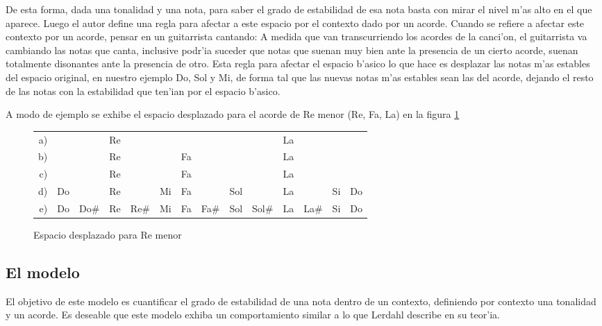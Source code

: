 
De esta forma, dada una tonalidad y una nota, para saber el grado de estabilidad de esa nota basta con mirar el nivel m'as alto en el que aparece.
Luego el autor define una regla para afectar a este espacio por el contexto dado por un acorde. Cuando se refiere a afectar este contexto por un acorde, pensar
en un guitarrista cantando: A medida que van transcurriendo los acordes de la canci'on, el guitarrista va cambiando las notas que canta, inclusive podr'ia
suceder que notas que suenan muy bien ante la presencia de un cierto acorde, suenan totalmente disonantes ante la presencia de otro. 
Esta regla para afectar el espacio b'asico lo que hace es desplazar las notas m'as estables del espacio original, en nuestro ejemplo Do, Sol y Mi, de forma tal
que las nuevas notas m'as estables sean las del acorde, dejando el resto de las notas con la estabilidad que ten'ian por el espacio b'asico. 

A modo de ejemplo se exhibe el espacio desplazado para el acorde de Re menor (Re, Fa, La) en la figura \ref{fig:dm_space}

\begin{figure}[!h]
\begin{center}
\begin{tabular}{r c c c c c c c c c c c c c} 
a) &    &      & Re &      &    &    &     &      &       & La &      &    &  \\
b) &    &      & Re &      &    & Fa &     &      &       & La &      &    &  \\
c) &    &      & Re &      &    & Fa &     &      &       & La &      &    &  \\
d) & Do &      & Re &      & Mi & Fa &     &  Sol &       & La &      & Si & Do\\
e) & Do & Do\# & Re & Re\# & Mi & Fa & Fa\# & Sol & Sol\# & La & La\# & Si & Do\\
\end{tabular}
\newline
\caption{ Espacio desplazado para Re menor}
\label{fig:dm_space}
\end{center}
\end{figure}

\subsection{El modelo}
\label{sec:harmonic_context_model}
El objetivo de este modelo es cuantificar el grado de estabilidad de una nota dentro de un contexto, definiendo por contexto una tonalidad y un acorde. 
Es deseable que este modelo exhiba un comportamiento similar a lo que Lerdahl describe en su teor'ia. 

